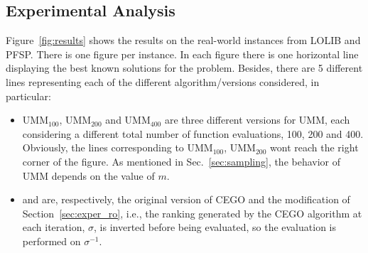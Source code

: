 \documentclass[sigconf,dvipsnames]{acmart}
\begin{document}




\subsection{Experimental Analysis} %


Figure~\ref{fig:results} shows the results on the real-world instances from LOLIB and PFSP. There is one figure per instance. In each figure there is one horizontal line displaying the best known solutions for the problem. Besides, there are 5 different lines representing each of the different algorithm/versions considered, in particular:
\begin{itemize}
\item UMM$_{100}$, UMM$_{200}$ and UMM$_{400}$ are three different versions for UMM, each considering a different total number of function evaluations, 100, 200 and 400. Obviously, the lines corresponding to UMM$_{100}$, UMM$_{200}$ wont reach the right corner of the figure. As mentioned in Sec.~\ref{sec:sampling}, the behavior of
UMM depends on the value of $m$. 
\item \CEGOorig and \CEGOinv are, respectively, the original version of CEGO and the modification of Section~\ref{sec:exper_ro}, i.e., the ranking generated by the CEGO algorithm at each iteration, $\sigma$, is inverted before being evaluated, so the evaluation is performed on $\sigma^{-1}$. 
\end{itemize}
\end{document}
